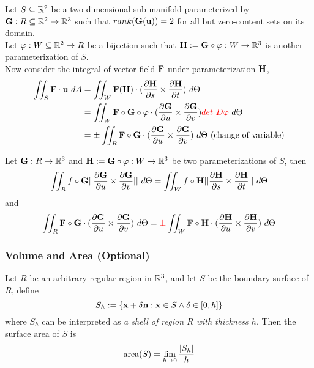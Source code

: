 \documentclass[11pt]{article}
\begin{document}
				\begin{remark}
					Let $S \subseteq \mathbb{R}^2$ be a two dimensional sub-manifold parameterized by $\textbf{G}: R \subseteq \mathbb{R}^2 \to \mathbb{R}^3$ such that $rank(\textbf{G}(\textbf{u})) = 2$ for all but zero-content sets on its domain. \\
					Let $\varphi: W\subseteq \mathbb{R}^2 \to R$ be a bijection such that $\textbf{H} := \textbf{G} \circ \varphi: W \to \mathbb{R}^3$ is another parameterization of $S$. \\
					Now consider the integral of vector field $\textbf{F}$ under parameterization $\textbf{H}$,
					\begin{align}
						\iint_S \ve{F} \cdot \ve{u}\ dA &= \iint_W \ve{F}(\ve{H}) \cdot (\pd{\ve{H}}{s} \times \pd{\ve{H}}{t})\ d\Theta \\
						&= \iint_W \ve{F}\circ\ve{G}\circ\varphi \cdot (\pd{\ve{G}}{u} \times \pd{\ve{G}}{v}) \red{det\ D\varphi}\ d\Theta \\
						&= \pm \iint_R \ve{F}\circ \ve{G} \cdot (\pd{\ve{G}}{u} \times \pd{\ve{G}}{v})\ d\Theta \tx{ (change of variable)}
					\end{align}
				\end{remark}
				
				\begin{theorem}[Invariance]
					Let $\textbf{G}: R \to \mathbb{R}^3$ and $\textbf{H} := \textbf{G}\circ\varphi: W \to \mathbb{R}^3$ be two parameterizations of $S$, then
					\begin{equation}
						\iint_R f\circ \textbf{G} \vert \vert {\frac{\partial{\textbf{G}}}{\partial{u}} \times \frac{\partial{\textbf{G}}}{\partial{v}}} \vert \vert\ d\Theta = \iint_W f\circ \textbf{H} \vert \vert {\frac{\partial{\textbf{H}}}{\partial{s}} \times \frac{\partial{\textbf{H}}}{\partial{t}}} \vert \vert\ d\Theta
					\end{equation}
					and 
					\begin{equation}
						\iint_R \textbf{F}\circ \textbf{G} \cdot (\frac{\partial{\textbf{G}}}{\partial{u}} \times \frac{\partial{\textbf{G}}}{\partial{v}})\ d\Theta 
						= \textcolor{red}{\pm}\iint_W \textbf{F}\circ \textbf{H} \cdot (\frac{\partial{\textbf{H}}}{\partial{u}} \times \frac{\partial{\textbf{H}}}{\partial{v}})\ d\Theta
					\end{equation}
				\end{theorem}
				
			\subsubsection{Volume and Area (Optional)}
				\begin{theorem}
					Let $R$ be an arbitrary regular region in $\mathbb{R}^3$, and let $S$ be the boundary surface of $R$, define
					\begin{equation}
						S_h := \{
							\textbf{x} + \delta \textbf{n}: \textbf{x} \in S \land \delta \in [0, h]
						\}
					\end{equation}
					where $S_h$ can be interpreted as \emph{a shell of region $R$ with thickness $h$}. Then the surface area of $S$ is 
					\begin{equation}
						\text{{area}}(S) = \lim_{h \to 0} \frac{|S_h|}{h}
					\end{equation}
				\end{theorem}
\end{document}
